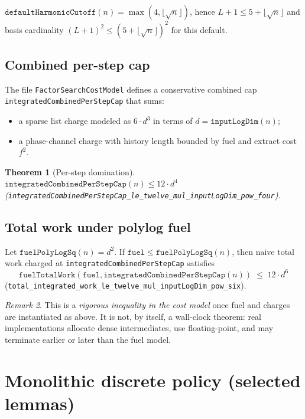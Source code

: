 \documentclass[11pt,a4paper]{article}
\theoremstyle{plain}
\newtheorem{theorem}{Theorem}[section]
\theoremstyle{definition}
\theoremstyle{remark}
\newtheorem{remark}[theorem]{Remark}
\begin{document}
$\texttt{defaultHarmonicCutoff}(n) = \max(4,\lfloor\sqrt{n}\rfloor)$, hence
$L+1 \le 5+\lfloor\sqrt{n}\rfloor$ and basis cardinality $(L+1)^2 \le (5+\lfloor\sqrt{n}\rfloor)^2$
for this default.

\subsection{Combined per-step cap}

The file \texttt{FactorSearchCostModel} defines a conservative combined cap
\texttt{integratedCombinedPerStepCap} that sums:
\begin{itemize}
\item a sparse list charge modeled as $6\cdot d^3$ in terms of $d=\texttt{inputLogDim}(n)$;
\item a phase-channel charge with history length bounded by fuel and extract cost $f^2$.
\end{itemize}

\begin{theorem}[Per-step domination]
$\texttt{integratedCombinedPerStepCap}(n) \le 12 \cdot d^4$
(\texttt{integratedCombinedPerStepCap\_le\_twelve\_mul\_inputLogDim\_pow\_four}).
\end{theorem}

\subsection{Total work under polylog fuel}

Let $\texttt{fuelPolyLogSq}(n) = d^2$. If $\texttt{fuel} \le \texttt{fuelPolyLogSq}(n)$,
then naive total work charged at \texttt{integratedCombinedPerStepCap} satisfies
\[
\texttt{fuelTotalWork}(\texttt{fuel},\texttt{integratedCombinedPerStepCap}(n))
\;\le\; 12 \cdot d^6
\]
(\texttt{total\_integrated\_work\_le\_twelve\_mul\_inputLogDim\_pow\_six}).

\begin{remark}
This is a \emph{rigorous inequality in the cost model} once fuel and charges are
instantiated as above. It is not, by itself, a wall-clock theorem: real implementations
allocate dense intermediates, use floating-point, and may terminate earlier or later
than the fuel model.
\end{remark}

\section{Monolithic discrete policy (selected lemmas)}
\end{document}

